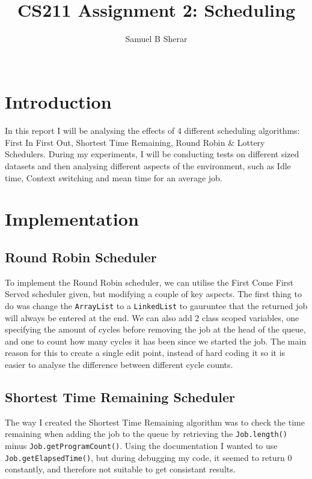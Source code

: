 \documentclass{acm_proc_article-sp}
\begin{document}
\title{CS211 Assignment 2: Scheduling}
\author{
  \alignauthor 
  Samuel B Sherar\\
  \
}

\maketitle

\section{Introduction}
In this report I will be analysing the effects of 4 different scheduling algorithms: First In First Out, Shortest Time Remaining, Round Robin \& Lottery Schedulers. During my experiments, I will be conducting tests on different sized datasets and then analysing different aspects of the environment, such as Idle time, Context switching and mean time for an average job.

\section{Implementation}

\subsection{Round Robin Scheduler}

To implement the Round Robin scheduler, we can utilise the First Come First Served scheduler given, but modifying a couple of key aspects. The first thing to do was change the \texttt{ArrayList} to a \texttt{LinkedList} to gauruntee that the returned job will always be entered at the end. We can also add 2 class scoped variables, one specifying the amount of cycles before removing the job at the head of the queue, and one to count how many cycles it has been since we started the job. The main reason for this to create a single edit point, instead of hard coding it so it is easier to analyse the difference between different cycle counts.

\subsection{Shortest Time Remaining Scheduler}

The way I created the Shortest Time Remaining algorithm was to check the time remaining when adding the job to the queue by retrieving the \texttt{Job.length()} minus \texttt{Job.get\-ProgramCount()}. Using the documentation I wanted to use \texttt{Job.getElapsedTime()}, but during debugging my code, it seemed to return 0 constantly, and therefore not suitable to get consistant results.
\end{document}
